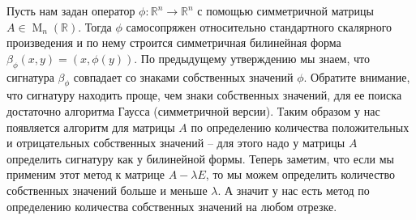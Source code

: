 Пусть нам задан оператор $\phi\colon \mathbb R^n\to \mathbb R^n$ с помощью симметричной матрицы $A\in \operatorname{M}_n(\mathbb R)$.
Тогда $\phi$ самосопряжен относительно стандартного скалярного произведения и по нему строится симметричная билинейная форма $\beta_\phi(x, y) = (x, \phi (y))$.
По предыдущему утверждению мы знаем, что сигнатура $\beta_\phi$ совпадает со знаками собственных значений $\phi$.
Обратите внимание, что сигнатуру находить проще, чем знаки собственных значений, для ее поиска достаточно алгоритма Гаусса (симметричной версии).
Таким образом у нас появляется алгоритм для матрицы $A$ по определению количества положительных и отрицательных собственных значений -- для этого надо у матрицы $A$ определить сигнатуру как у билинейной формы.
Теперь заметим, что если мы применим этот метод к матрице $A - \lambda E$, то мы можем определить количество собственных значений больше и меньше $\lambda$.
А значит у нас есть метод по определению количества собственных значений на любом отрезке.

